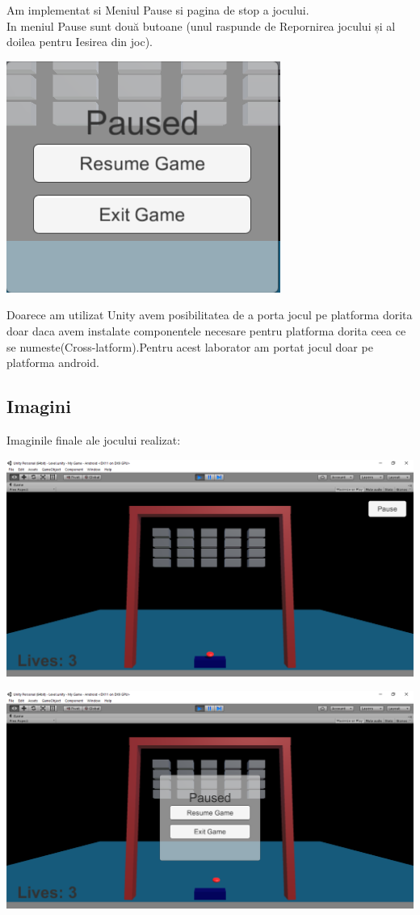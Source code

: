 Am implementat si Meniul Pause si pagina de stop a jocului.\\
In meniul Pause sunt două butoane (unul raspunde de Repornirea jocului și al doilea pentru Iesirea din joc).\\
\begin{center}
\includegraphics[scale=0.5]{images/6}\\
\end{center}
Doarece am utilizat Unity avem posibilitatea de a porta jocul pe platforma dorita doar daca avem instalate componentele necesare pentru platforma dorita ceea ce se numeste(Cross-latform).Pentru acest laborator am portat jocul doar pe platforma android.\\

\subsection{Imagini}
Imaginile finale ale jocului realizat:
\begin{center}
\includegraphics[scale=0.5]{images/final}\\
\end{center}
\begin{center}
\includegraphics[scale=0.5]{images/final1}\\
\end{center}

\clearpage